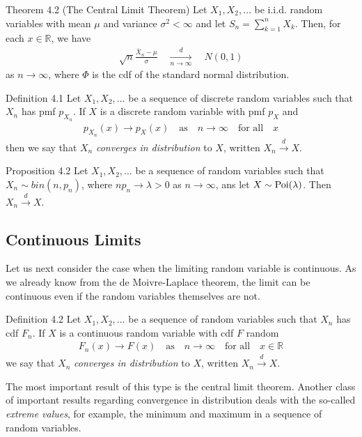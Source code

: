 \begin{boks}{Theorem 4.2 (The Central Limit Theorem)}
  Let $X_1, X_2, \ldots$ be i.i.d. random variables with mean $\mu$ and variance $\sigma^2 < \infty$ and let $S_n = \sum_{k = 1}^{n} X_k$. Then, for each $x \in \mathbb{R}$, we have
  \begin{align*}
    \sqrt{n}\frac{\bar{X}_n - \mu}{\sigma} \quad \xrightarrow[n \rightarrow \infty]{d} \quad N(0,1)
  \end{align*}
  as $n \rightarrow \infty$, where $\Phi$ is the cdf of the standard normal distribution.
\end{boks}
\begin{boks}{Definition 4.1}
  Let $X_1, X_2, \ldots$ be a sequence of discrete random variables such that $X_n$ has pmf $p_{X_n}$. If $X$ is a discrete random variable with pmf $p_X$ and
  \begin{align*}
    p_{X_n}(x) \rightarrow p_{X}(x) \quad
    \text{as} \quad n \rightarrow \infty \quad \text{for all} \quad x
  \end{align*}
  then we say that $X_n$ \textit{converges in distribution} to $X$, written $X_n \xrightarrow{d} X$.
\end{boks}
\begin{boks}{Proposition 4.2}
  Let $X_1, X_2, \ldots$ be a sequence of random variables such that $X_n \sim bin(n, p_n)$, where $np_n \rightarrow \lambda > 0$ as $n \rightarrow \infty$, ans let $X \sim \operatorname{Poi}(\lambda)$. Then $X_n \xrightarrow{d} X$.
\end{boks}

\subsection{Continuous Limits}
Let us next consider the case when the limiting random variable is continuous. As we already know from the de Moivre-Laplace theorem, the limit can be continuous even if the random variables themselves are not.
\begin{boks}{Definition 4.2}
  Let $X_1, X_2, \ldots$ be a sequence of random variables such that $X_n$ has cdf $F_n$. If $X$ is a continuous random variable with cdf $F$ random
  \begin{align*}
    F_n(x) \rightarrow F(x)
    \quad \text{as} \quad
    n \rightarrow \infty
    \quad \text{for all} \quad
    x \in \mathbb{R}
  \end{align*}
we say that $X_n$ \textit{converges in distribution} to $X$, written $X_n \xrightarrow{d} X$.
\end{boks}
The most important result of this type is the central limit theorem. Another class of important results regarding convergence in distribution deals with the so-called \textit{extreme values}, for example, the minimum and maximum in a sequence of random variables.
